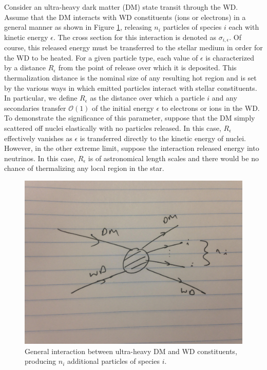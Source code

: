 \documentclass[twocolumn,showpacs,preprintnumbers,amsmath,amssymb,prl]{revtex4}
\newcommand{\OO}{\mathcal{O}}
\begin{document}
Consider an ultra-heavy dark matter (DM) state transit through the WD. Assume that the DM interacts with WD constituents (ions or electrons) in a general manner as shown in Figure \ref{fig:feynmandiag}, releasing $n_i$ particles of species $i$ each with kinetic energy $\epsilon$. The cross section for this interaction is denoted as $\sigma_{i,\epsilon}$. Of course, this released energy must be transferred to the stellar medium in order for the WD to be heated. For a given particle type, each value of $\epsilon$ is characterized by a distance $R_\epsilon$ from the point of release over which it is deposited. This thermalization distance is the nominal size of any resulting hot region and is set by the various ways in which emitted particles interact with stellar constituents. In particular, we define $R_\epsilon$ as the distance over which a particle $i$ and any secondaries transfer $\OO(1)$ of the initial energy $\epsilon$ to electrons or ions in the WD. To demonstrate the significance of this parameter, suppose that the DM simply scattered off nuclei elastically with no particles released. In this case, $R_\epsilon$ effectively vanishes as $\epsilon$ is transferred directly to the kinetic energy of nuclei. However, in the other extreme limit, suppose the interaction released energy into neutrinos. In this case, $R_\epsilon$ is of astronomical length scales and there would be no chance of thermalizing any local region in the star. 

\begin{figure}
\label{fig:feynmandiag}
\includegraphics[scale=.05]{feynmandiag}
\caption{General interaction between ultra-heavy DM and WD constituents, producing $n_i$ additional particles of species $i$.}
\end{figure}
\end{document}

